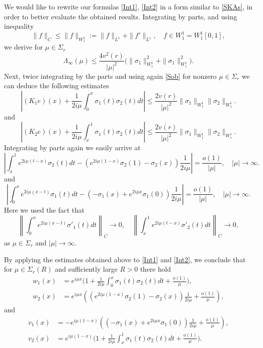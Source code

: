\documentclass[11pt]{amsart}
\theoremstyle{plain}
\theoremstyle{definition}
\theoremstyle{remark}
\numberwithin{equation}{section}
\begin{document}
We would like to rewrite our formulas
\eqref{Int1}, \eqref{Int2} in a form similar to \eqref{SKAs}, in order to better evaluate the obtained results.
Integrating by parts,
and using inequality
\begin{equation}\label{Sob}
\|f\|_C\le \|f\|_{W_1^1}:=\|f\|_{L^1}+\|f'\|_{L^1},\quad f\in W_1^1=W_1^1[0,1],
\end{equation}
we derive for $\mu \in \Sigma_r$
\begin{equation}
\Lambda_\infty(\mu) \le
\frac{4v^2(r)}{|\mu|^2}\Big(\|\sigma_1\|^2_{W_1^1}+\|\sigma_1\|^2_{W_1^1}\Big).
\end{equation}
Next, twice integrating by the parts and using again \eqref{Sob}
for nonzero $\mu \in \Sigma_r$ we can deduce the following estimates
\begin{equation}
\left|(K_1e)(x)+
\frac{1}{2i\mu}
\int_0^x\sigma_1(t)
\sigma_2(t)dt\right|\le \frac{2v(r)}{|\mu|^2}\|\sigma_1\|_{W_1^1}\|\sigma_2\|_{W_1^1}.
\end{equation}
and
\begin{equation}
  \left|(K_2e)(x)+
\frac{1}{2i\mu}
\int_x^1\sigma_1(t)
\sigma_2(t)dt\right|\le \frac{2v(r)}{|\mu|^2}\|\sigma_1\|_{W_1^1}\|\sigma_2\|_{W_1^1}.
\end{equation}
Integrating by parts again
we easily arrive at
\begin{equation}
\left|\int_x^1 e^{2i \mu (t-x)}\sigma_2(t)dt-
(e^{2i \mu (1-x)}\sigma_2(1)
 - \sigma_2(x))\frac{1}{2i\mu}\right|
= \frac{o(1)}{|\mu|}, \quad |\mu|\to\infty.
\end{equation}
and
\begin{equation}
\left|\int_0^x e^{2i \mu (x-t)}\sigma_1(t)dt-(- \sigma_1(x)+
e^{2i \mu x}\sigma_1(0))\frac{1}{2i\mu}\right|
= \frac{o(1)}{|\mu|}, \quad |\mu|\to\infty.
\end{equation}
Here we used the fact that
\[
\left\|\int_0^x e^{2i \mu (x-t)}\sigma'_1(t)dt\right\|_C
\to 0, \quad \left\|\int_x^1 e^{2i \mu (t-x)}\sigma'_2(t)dt\right\|_C
\to 0,
\]
as
$\mu\in \Sigma_r$ and $|\mu|\to\infty$.

By applying the estimates obtained above to \eqref{Int1} and \eqref{Int2},
we conclude that for $\mu \in \Sigma_r(R)$ and sufficiently large $R>0$ there hold
\begin{align*}
 w_1(x)&=e^{i \mu x}\Big(1+
\frac{1}{2i\mu}
\int_0^x\sigma_1(t)
\sigma_2(t)dt +\frac{\mbox{o}(1)}{\mu}
\Big), \\
  w_2(x)&=e^{i \mu x}\left(
(e^{2i \mu (1-x)}\sigma_2(1)
 - \sigma_2(x))\frac{1}{2i\mu}+\frac{\mbox{o}(1)}{\mu}\right),
\end{align*}
and
\begin{align*}
 v_1(x)&=-e^{i \mu (1-x)}\left((- \sigma_1(x)+
e^{2i \mu x}\sigma_1(0))\frac{1}{2i\mu}+\frac{\mbox{o}(1)}{\mu}\right),  \\
v_2(x)&=e^{i \mu(1-x)}\Big(1+
\frac{1}{2i\mu}
\int_x^1\sigma_1(t)
\sigma_2(t)dt+\frac{\mbox{o}(1)}{\mu}
\Big).
\end{align*}
\end{document}
